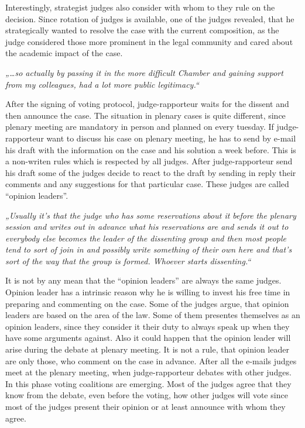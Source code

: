 \documentclass[
  11pt,
]{article}
\begin{document}
Interestingly, strategist judges also consider with whom to they rule on
the decision. Since rotation of judges is available, one of the judges
revealed, that he strategically wanted to resolve the case with the
current composition, as the judge considered those more prominent in the
legal community and cared about the academic impact of the case.

\emph{„\ldots so actually by passing it in the more difficult Chamber
and gaining support from my colleagues, had a lot more public
legitimacy.``}

After the signing of voting protocol, judge-rapporteur waits for the
dissent and then announce the case. The situation in plenary cases is
quite different, since plenary meeting are mandatory in person and
planned on every tuesday. If judge-rapporteur want to discuss his case
on plenary meeting, he has to send by e-mail his draft with the
information on the case and his solution a week before. This is a
non-writen rules which is respected by all judges. After
judge-rapporteur send his draft some of the judges decide to react to
the draft by sending in reply their comments and any suggestions for
that particular case. These judges are called ``opinion leaders''.

\emph{„Usually it's that the judge who has some reservations about it
before the plenary session and writes out in advance what his
reservations are and sends it out to everybody else becomes the leader
of the dissenting group and then most people tend to sort of join in and
possibly write something of their own here and that's sort of the way
that the group is formed. Whoever starts dissenting.``}

It is not by any mean that the ``opinion leaders'' are always the same
judges. Opinion leader has a intrinsic reason why he is willing to
invest his free time in preparing and commenting on the case. Some of
the judges argue, that opinion leaders are based on the area of the law.
Some of them presentes themselves as an opinion leaders, since they
consider it their duty to always speak up when they have some arguments
against. Also it could happen that the opinion leader will arise during
the debate at plenary meeting. It is not a rule, that opinion leader are
only those, who comment on the case in advance. After all the e-mails
judges meet at the plenary meeting, when judge-rapporteur debates with
other judges. In this phase voting coalitions are emerging. Most of the
judges agree that they know from the debate, even before the voting, how
other judges will vote since most of the judges present their opinion or
at least announce with whom they agree.
\end{document}
